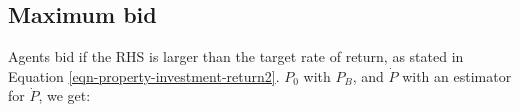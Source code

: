 






\subsection{Maximum bid} %

Agents bid if the RHS is larger than the target rate of return, as stated in Equation \ref{eqn-property-investment-return2}.  $P_0$ with $P_B$, and $\dot P$ with an estimator for $\dot P$, we get: %

